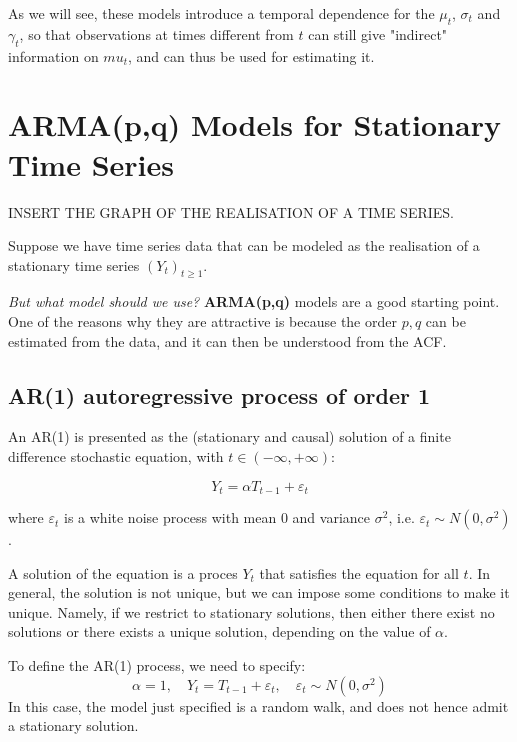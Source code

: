             As we will see, these models introduce a temporal dependence for the \(\mu_t\), \(\sigma_t\) and \(\gamma_t\), so that observations at times different from \(t\) can still give "indirect" information on \(mu_t\), and can thus be used for estimating it.

\section{ARMA(p,q) Models for Stationary Time Series}

    INSERT THE GRAPH OF THE REALISATION OF A TIME SERIES.

    Suppose we have time series data that can be modeled as the realisation of a stationary time series \((Y_t)_{t \geq 1}\).

    \textit{But what model should we use?} \textbf{ARMA(p,q)} models are a good starting point. One of the reasons why they are attractive is because the order \(p,q\) can be estimated from the data, and it can then be understood from the ACF.

    \subsection{AR(1) autoregressive process of order 1}

        An AR(1) is presented as the (stationary and causal) solution of a finite difference stochastic equation, with \(t \in (-\infty, +\infty)\):

        \begin{equation}
            Y_t = \alpha T_{t-1} + \varepsilon_t 
        \end{equation}

        where \(\varepsilon_t\) is a white noise process with mean 0 and variance \(\sigma^2\), i.e. \(\varepsilon_t \sim N(0, \sigma^2)\).

        A solution of the equation is a proces \(Y_t\) that satisfies the equation for all \(t\). In general, the solution is not unique, but we can impose some conditions to make it unique.
        Namely, if we restrict to stationary solutions, then either there exist no solutions or there exists a unique solution, depending on the value of \(\alpha\).

        \begin{example}[\(\alpha =1\)]
            To define the AR(1) process, we need to specify:
            \[
            \alpha = 1, \quad Y_t = T_{t-1} + \varepsilon_t, \quad \varepsilon_t \sim N(0, \sigma^2)
            \]
            In this case, the model just specified is a random walk, and does not hence admit a stationary solution.
        \end{example}

